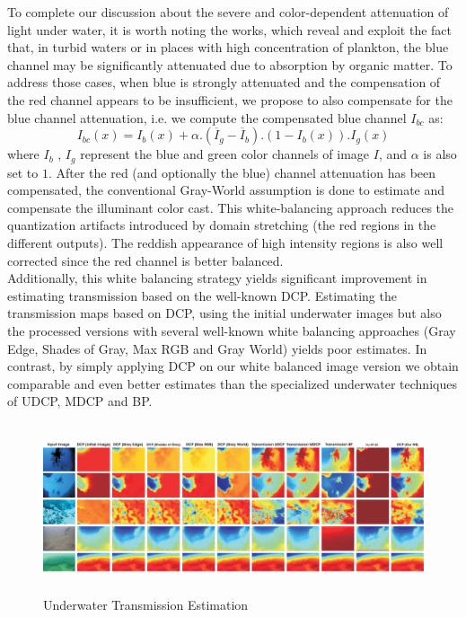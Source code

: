 \documentclass[hidelinks, 12pt]{report}
\begin{document}
To complete our discussion about the severe and color-dependent attenuation of light under water, it is worth noting the works, which reveal and exploit the fact that, in turbid waters or in places with high concentration of plankton, the blue channel may be significantly attenuated due to absorption by organic matter. To address those cases, when blue is strongly attenuated and the compensation of the red channel appears to be insufficient, we propose to also compensate for the blue channel attenuation, i.e. we compute the compensated blue channel $I_{bc}$ as:
\begin{equation}
I_{bc}(x)=I_b(x)+\alpha.(\overline{I}_g-\overline{I}_b).(1-I_b(x)).I_g(x)
\end{equation}
where $I_b$ , $I_g$ represent the blue and green color channels of image $I$, and $\alpha$ is also set to $1$. After the red (and optionally the blue) channel attenuation has been compensated, the conventional Gray-World assumption is done to estimate and compensate the illuminant color cast. This white-balancing approach reduces the quantization artifacts introduced by domain stretching (the red regions in the different outputs). The reddish appearance of high intensity regions is also well corrected since the red channel is better balanced.\\
Additionally, this white balancing strategy yields significant improvement in estimating transmission based on the well-known DCP. Estimating the transmission maps based on DCP, using the initial underwater images but also the processed versions with several well-known white balancing approaches (Gray Edge, Shades of Gray, Max RGB and Gray World) yields poor estimates. In contrast, by simply applying DCP on our white balanced
image version we obtain comparable and even better estimates than the specialized underwater techniques of UDCP, MDCP and BP.
\begin{figure}[H]
\centering
\includegraphics[width=15cm,height=5cm]{Transmission.png}
\caption[Underwater Transmission Estimation]{Underwater Transmission Estimation}
\label{Underwater Transmission Estimation}
\end{figure}
\end{document}

